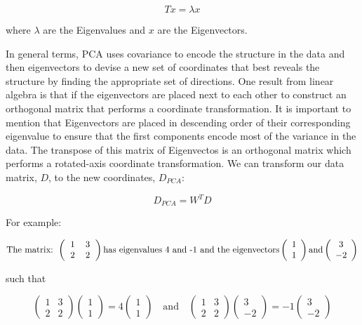 \documentclass[11pt, oneside]{article}   	%
\begin{document}
\begin{equation}
T x = \lambda x
\end{equation} 

\noindent where $\lambda$ are the Eigenvalues and $x$ are the Eigenvectors. 

In general terms, PCA uses covariance to encode the structure in the data and then eigenvectors to devise a new set of coordinates that best reveals the structure by finding the appropriate set of directions. One result from linear algebra is that if the eigenvectors are placed next to each other to construct an orthogonal matrix that performs a coordinate transformation. It is important to mention that Eigenvectors are placed in descending order of their corresponding eigenvalue to ensure that the first components encode most of the variance in the data.
The transpose of this matrix of Eigenvectos is an orthogonal matrix which performs a rotated-axis coordinate transformation. We can transform our data matrix, $D$, to the new coordinates, $D_{PCA}$:  

\[
   D_{PCA} = W^T D
\]


For example: 

\[ \text{The matrix: }
%
   \left(
      \begin{tabular}{cc}
      1 & 3 \\ 
      2 & 2
      \end{tabular}
   \right)
   \text{has eigenvalues 4 and -1}
   \text{ and the eigenvectors}
   \left( \begin{array}{c}
      1 \\ 
      1
      \end{array}
   \right)
   \text{and} 
   \left( \begin{array}{c}
      3 \\ 
      -2
      \end{array}
   \right)
\]


such that

\[ \left( \begin{array}{cc}
      1 & 3\\ 
      2 & 2
      \end{array} \right)
%
   \left( \begin{array}{c}
      1 \\ 
      1
      \end{array} \right)
%
   = 4
   \left( \begin{array}{c}
   1\\
   1
   \end{array} \right)
\text{~~~and~~~}
   \left( \begin{array}{cc}
   1 & 3\\
   2 & 2
   \end{array} \right)
%
   \left( \begin{array}{c}
   3\\
   -2
   \end{array} \right)
%
   =-1
   \left( \begin{array}{c}
   3\\
   -2
   \end{array} \right)
\]
\end{document}
